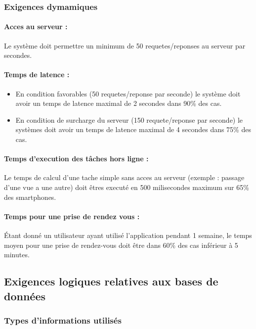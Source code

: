 \documentclass{article}
\begin{document}
\subsubsection{Exigences dymamiques}
\paragraph{Acces au serveur :}
Le système doit permettre un minimum de 50 requetes/reponses au serveur
par secondes.
\paragraph{Temps de latence :}
\begin{itemize}
\item En condition favorables (50 requetes/reponse par seconde) le
  système doit avoir un temps de latence maximal de 2 secondes dans
  90\% des cas.
\item En condition de surcharge du serveur (150 requete/reponse par
  seconde) le systèmes doit avoir un temps de latence maximal de 4
  secondes dans 75\% des cas.
\end{itemize}

\paragraph{Temps d'execution des tâches hors ligne :}
Le temps de calcul d'une tache simple sans acces au serveur (exemple : passage d'une vue a
une autre) doit êtres executé en 500 milisecondes maximum sur 65\% des
smartphones.

\paragraph{Temps pour une prise de rendez vous :}
Étant donné un utilisateur ayant utilisé l'application pendant 1
semaine, le temps moyen pour une prise de rendez-vous doit être dans
60\% des cas inférieur à 5 minutes.

\subsection{Exigences logiques relatives aux bases de données}
\subsubsection{Types d'informations utilisés}
\end{document}

